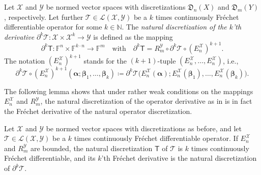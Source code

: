 \documentclass[a4paper]{paper}
\newcommand*{\SPC}[1]{{\ensuremath{\mathscr{#1}}}}
\newcommand*{\SPCL}{\SPC{L}}
\newcommand*{\SPCX}{\SPC{X}}
\newcommand*{\SPCY}{\SPC{Y}}
\newcommand*{\BLINOP}[2]{{\SPCL(#1, #2)}}
\newcommand{\FIELD}{{\ensuremath{\mathbb{F}}}}
\newcommand*{\Fn}{{\ensuremath{\FIELD^n}}}
\newcommand*{\Fm}{{\ensuremath{\FIELD^m}}}
\newcommand{\NN}{{\ensuremath{\mathbb{N}}}}
\newcommand*{\OP}[1]{{\ensuremath{\mathcal{#1}}}}
\newcommand*{\OPT}{\OP{T}}
\newcommand{\DISCOP}[1]{{\ensuremath{\mathsf{#1}}}}
\newcommand*{\DISCOPT}{\DISCOP{T}}
\newcommand*{\EXT}[2]{\ensuremath{E_{#1}^{#2}}}
\newcommand*{\REST}[2]{\ensuremath{R_{#1}^{#2}}}
\newcommand*{\RmY}{{\ensuremath{\REST{m}{\SPC{Y}}}}}
\newcommand*{\EnX}{{\ensuremath{\EXT{n}{\SPC{X}}}}}
\newcommand*{\DISCR}[2]{{\ensuremath{\mathfrak{D}_{#2}(#1)}}}
\newcommand*{\DISCRnX}{\DISCR{X}{n}}
\newcommand*{\DISCRmY}{\DISCR{Y}{m}}
\DeclareMathOperator{\DEFEQ}{{\coloneqq}}
\newcommand{\valpha}{\boldsymbol{\alpha}}
\newcommand{\vbeta}{\boldsymbol{\beta}}
\begin{document}
\begin{definition}
 \label{def:discr:operator:op_deriv:operator_deriv_discr}
 Let $\SPCX$ and $\SPCY$ be normed vector spaces with discretizations $\DISCRnX$ and $\DISCRmY$, 
 respectively. Let further $\OPT \in \BLINOP{\SPCX}{\SPCY}$ be a $k$ times continuously Fr\'{e}chet 
 differentiable operator for some $k \in  \NN$. The \emph{natural discretization of the $k$'th derivative} 
 $\partial^k \OPT \colon \SPCX \times \SPCX^k \to \SPCY$ is defined as the mapping
 \begin{equation*}
  \partial^k \DISCOPT \colon \Fn \times \FIELD^{k\cdot n} \to \Fm
  \quad \text{with} \quad
  \partial^k \DISCOPT = \RmY \circ \partial^k \OPT \circ (\EnX)^{k+1}.
 \end{equation*}
 The notation $(\EnX)^{k+1}$ stands for the $(k+1)$-tuple $(\EnX, \dots, \EnX)$, i.e., 
 \begin{equation*}
  \partial^k \OPT \circ (\EnX)^{k+1}(\valpha; \vbeta_1, \dots, \vbeta_k) \DEFEQ 
 \partial^k \OPT\big( \EnX(\valpha); \EnX(\vbeta_1), \dots, \EnX(\vbeta_k) \big).
 \end{equation*}
\end{definition}


The following lemma shows that under rather weak conditions on the mappings $E_n^{\SPCX}$ and $R_m^{\SPCY}$, the 
natural discretization of the operator derivative as in  is in 
fact the Fr\'{e}chet derivative of the natural operator discretization.


\begin{lemma}
 \label{lemma:discr:operator:op_deriv:natural_is_deriv}
 Let $\SPCX$ and $\SPCY$ be normed vector spaces with discretizations as before, and let 
 $\OPT \in \BLINOP{\SPCX}{\SPCY}$ be a $k$ times continuously Fr\'{e}chet differentiable 
 operator. If $E_n^{\SPCX}$ and $R_m^{\SPCY}$ are bounded, the natural discretization $\DISCOPT$ of $\OPT$ is 
 $k$ times  continuously Fr\'{e}chet differentiable, and its $k$'th Fr\'{e}chet derivative is the natural 
 discretization of $\partial^k\OPT$.
\end{lemma}
\vspace{1em}
\end{document}
